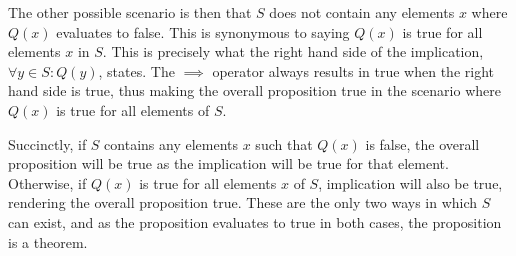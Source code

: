 \documentclass[titlepage]{article}
\begin{document}
The other possible scenario is then that $S$ does not contain any elements $x$ where $Q(x)$ evaluates to false. This is synonymous to saying $Q(x)$ is true for all elements $x$ in $S$. This is precisely what the right hand side of the implication, \(\forall y \in S: Q(y)\), states. The $\implies$ operator always results in true when the right hand side is true, thus making the overall proposition true in the scenario where $Q(x)$ is true for all elements of $S$.

Succinctly, if $S$ contains any elements $x$ such that $Q(x)$ is false, the overall proposition will be true as the implication will be true for that element. Otherwise, if $Q(x)$ is true for all elements $x$ of $S$, implication will also be true, rendering the overall proposition true. These are the only two ways in which $S$ can exist, and as the proposition evaluates to true in both cases, the proposition is a theorem. 
\end{document}
